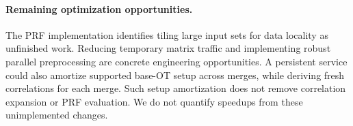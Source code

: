 



\paragraph{Remaining optimization opportunities.}
The PRF implementation identifies tiling large input sets for data locality as
unfinished work. Reducing temporary matrix traffic and implementing robust
parallel preprocessing are concrete engineering opportunities.
A persistent service could also amortize supported base-OT setup across merges,
while deriving fresh correlations for each merge.
Such setup amortization does not remove correlation expansion or PRF evaluation.
We do not quantify speedups from these unimplemented changes.
\clearpage
